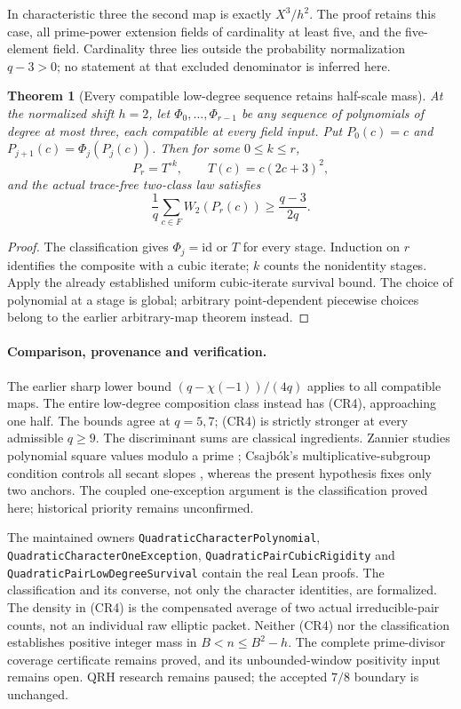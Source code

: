 \documentclass[11pt]{article}
\newtheorem{theorem}{Theorem}[section]
\begin{document}
In characteristic three the second map is exactly \(X^3/h^2\).
The proof retains this case, all prime-power extension fields of
cardinality at least five, and the five-element field. Cardinality
three lies outside the probability normalization \(q-3>0\);
no statement at that excluded denominator is inferred here.

\begin{theorem}[Every compatible low-degree sequence retains half-scale mass]
\label{thm:low-degree-square-survival}
At the normalized shift \(h=2\), let \(\Phi_0,\ldots,\Phi_{r-1}\)
be any sequence of polynomials of degree at most three, each
compatible at every field input. Put \(P_0(c)=c\) and
\(P_{j+1}(c)=\Phi_j(P_j(c))\). Then for some \(0\le k\le r\),
\[
 P_r=T^{\circ k},\qquad T(c)=c(2c+3)^2,
\]
and the actual trace-free two-class law satisfies
\[
 \boxed{\qquad
 \frac1q\sum_{c\in F}W_2(P_r(c))
                    \ge\frac{q-3}{2q}.
 \qquad}                                               \tag{CR4}
\]
\end{theorem}
\begin{proof}
The classification gives \(\Phi_j=\mathrm{id}\) or \(T\) for every
stage. Induction on \(r\) identifies the composite with a cubic
iterate; \(k\) counts the nonidentity stages.
Apply the already established uniform cubic-iterate survival bound.
The choice of polynomial at a stage is global; arbitrary
point-dependent piecewise choices belong to the earlier
arbitrary-map theorem instead.
\end{proof}

\paragraph{Comparison, provenance and verification.}
The earlier sharp lower bound \((q-\chi(-1))/(4q)\) applies to all
compatible maps. The entire low-degree composition class instead
has (CR4), approaching one half. The bounds agree at \(q=5,7\);
(CR4) is strictly stronger at every admissible \(q\ge9\).
The discriminant sums are classical ingredients. Zannier studies
polynomial square values modulo a prime
\cite{ZannierSquareValues}; Csajb\'ok's multiplicative-subgroup
condition controls all secant slopes \cite{CsajbokSecants},
whereas the present hypothesis fixes only two anchors.
The coupled one-exception argument is the classification proved
here; historical priority remains unconfirmed.

The maintained owners
\texttt{QuadraticCharacterPolynomial},
\texttt{QuadraticCharacterOneException},
\texttt{QuadraticPairCubicRigidity} and
\texttt{QuadraticPairLowDegreeSurvival} contain the real Lean proofs.
The classification and its converse, not only the character
identities, are formalized. The density in (CR4) is the compensated
average of two actual irreducible-pair counts, not an individual
raw elliptic packet. Neither (CR4) nor the classification establishes
positive integer mass in \(B<n\le B^2-h\).
The complete prime-divisor coverage certificate remains proved,
and its unbounded-window positivity input remains open.
QRH research remains paused; the accepted \(7/8\) boundary is unchanged.
\end{document}
